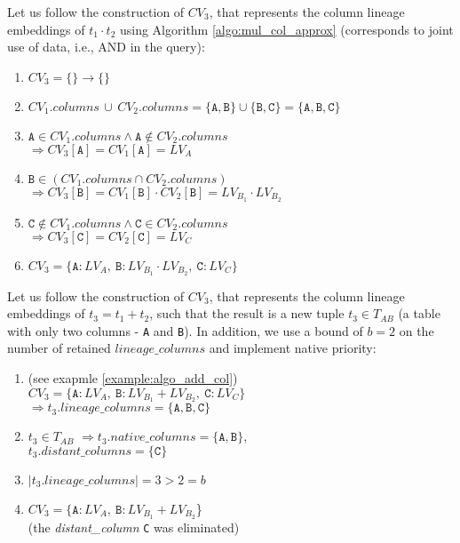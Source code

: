 \begin{example-withrun}
    Let us follow the construction of $CV_3$, that represents the column lineage embeddings of $t_1 \cdot t_2$ using Algorithm \ref{algo:mul_col_approx} (corresponds to joint use of data, i.e., AND in the query):
    \begin{enumerate}
        \item $CV_3 = \{\} \rightarrow \{\}$
        \item $CV_1.columns \,\cup\, CV_2.columns = \{\texttt{A}, \texttt{B}\} \cup \{\texttt{B}, \texttt{C}\} = \{\texttt{A}, \texttt{B}, \texttt{C}\}$
        \item $\texttt{A} \in CV_1.columns \wedge \texttt{A} \notin CV_2.columns $\\ $\Rightarrow CV_3[\texttt{A}] = CV_1[\texttt{A}] = LV_A$
        \item $\texttt{B} \in (CV_1.columns \cap CV_2.columns) $\\ $\Rightarrow CV_3[\texttt{B}] = CV_1[\texttt{B}] \cdot CV_2[\texttt{B}] = LV_{B_1} \cdot LV_{B_2}$
        \item $\texttt{C} \notin CV_1.columns \wedge \texttt{C} \in CV_2.columns $\\ $\Rightarrow CV_3[\texttt{C}] = CV_2[\texttt{C}] = LV_C$
        \item $CV_3 = \{\texttt{A}\!: LV_A,\: \texttt{B}\!: LV_{B_1} \cdot LV_{B_2},\: \texttt{C}\!: LV_C\}$
    \end{enumerate}
\end{example-withrun}
\begin{example-withrun}\label{example:generational_priority}
    Let us follow the construction of $CV_3$, that represents the column lineage embeddings of $t_3 = t_1 + t_2$, such that the result is a new tuple $t_3 \in T_{AB}$ (a table with only two columns - \texttt{A} and \texttt{B}). In addition, we use a bound of $b = 2$ on the number of retained $lineage\_columns$ and implement native priority:
    \begin{enumerate}
        \item (see exapmle \ref{example:algo_add_col})\\ $CV_3 = \{\texttt{A}\!: LV_A,\: \texttt{B}\!: LV_{B_1} + LV_{B_2},\: \texttt{C}\!: LV_C\}$\\ $\Rightarrow t_3.lineage\_columns = \{\texttt{A}, \texttt{B}, \texttt{C}\}$
        \item $t_3 \in T_{AB}$ $\Rightarrow t_3.native\_columns = \{\texttt{A}, \texttt{B}\}$, \\$t_3.distant\_columns = \{\texttt{C}\}$
        \item $|t_3.lineage\_columns| = 3 > 2 = b$
        \item $CV_3 = \{\texttt{A}\!: LV_A,\: \texttt{B}\!: LV_{B_1} + LV_{B_2}$\}\\ (the \textit{distant\_column} \texttt{C} was eliminated)
    \end{enumerate}
\end{example-withrun}
